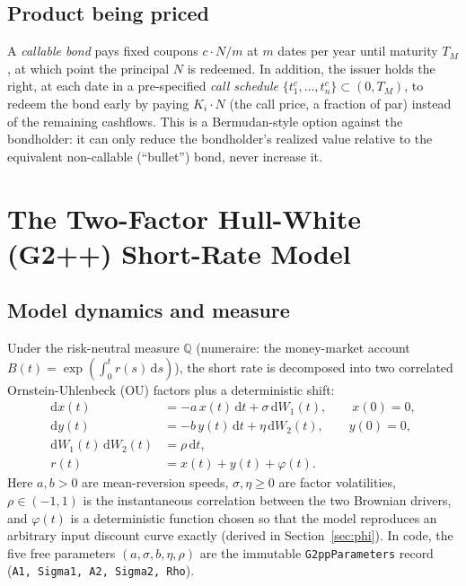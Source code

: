 \documentclass[11pt,a4paper]{article}
\newcommand{\dd}{\mathrm{d}}
\newcommand{\Q}{\mathbb{Q}}
\newcommand{\coderef}[1]{\texttt{\color{blue!60!black}#1}}
\theoremstyle{definition}
\begin{document}
\subsection{Product being priced}

A \emph{callable bond} pays fixed coupons $c\cdot N/m$ at $m$ dates per year
until maturity $T_M$, at which point the principal $N$ is redeemed. In
addition, the issuer holds the right, at each date in a pre-specified
\emph{call schedule} $\{t_1^c,\dots,t_n^c\}\subset(0,T_M)$, to redeem the
bond early by paying $K_i\cdot N$ (the call price, a fraction of par) instead
of the remaining cashflows. This is a Bermudan-style option against the
bondholder: it can only reduce the bondholder's realized value relative to
the equivalent non-callable (``bullet'') bond, never increase it.

\section{The Two-Factor Hull-White (G2++) Short-Rate Model}
\label{sec:g2pp}

\subsection{Model dynamics and measure}

Under the risk-neutral measure $\Q$ (numeraire: the money-market account
$B(t)=\exp(\int_0^t r(s)\,\dd s)$), the short rate is decomposed into two
correlated Ornstein-Uhlenbeck (OU) factors plus a deterministic shift:
\begin{align}
  \dd x(t) &= -a\,x(t)\,\dd t + \sigma\,\dd W_1(t), \qquad x(0)=0, \label{eq:x-sde}\\
  \dd y(t) &= -b\,y(t)\,\dd t + \eta\,\dd W_2(t), \qquad y(0)=0, \label{eq:y-sde}\\
  \dd W_1(t)\,\dd W_2(t) &= \rho\,\dd t, \label{eq:corr}\\
  r(t) &= x(t) + y(t) + \varphi(t). \label{eq:short-rate}
\end{align}
Here $a,b>0$ are mean-reversion speeds, $\sigma,\eta\ge 0$ are factor
volatilities, $\rho\in(-1,1)$ is the instantaneous correlation between the
two Brownian drivers, and $\varphi(t)$ is a deterministic function chosen so
that the model reproduces an arbitrary input discount curve exactly
(derived in Section~\ref{sec:phi}). In code, the five free parameters
$(a,\sigma,b,\eta,\rho)$ are the immutable \coderef{G2ppParameters} record
(\coderef{A1, Sigma1, A2, Sigma2, Rho}).
\end{document}
